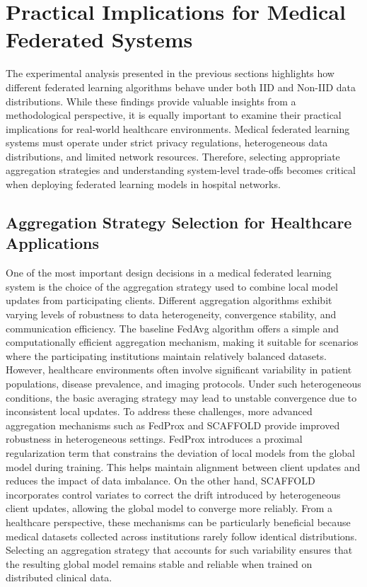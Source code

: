 \documentclass[12pt]{book}
\begin{document}
\chapter{Practical Implications for Medical Federated Systems}
The experimental analysis presented in the previous sections highlights how different federated learning algorithms behave under both IID and Non-IID data distributions. While these findings provide valuable insights from a methodological perspective, it is equally important to examine their practical implications for real-world healthcare environments. Medical federated learning systems must operate under strict privacy regulations, heterogeneous data distributions, and limited network resources. Therefore, selecting appropriate aggregation strategies and understanding system-level trade-offs becomes critical when deploying federated learning models in hospital networks.


\section{Aggregation Strategy Selection for Healthcare Applications}
One of the most important design decisions in a medical federated learning system is the choice of the aggregation strategy used to combine local model updates from participating clients. Different aggregation algorithms exhibit varying levels of robustness to data heterogeneity, convergence stability, and communication efficiency.
The baseline FedAvg algorithm offers a simple and computationally efficient aggregation mechanism, making it suitable for scenarios where the participating institutions maintain relatively balanced datasets. However, healthcare environments often involve significant variability in patient populations, disease prevalence, and imaging protocols. Under such heterogeneous conditions, the basic averaging strategy may lead to unstable convergence due to inconsistent local updates.
To address these challenges, more advanced aggregation mechanisms such as FedProx and SCAFFOLD provide improved robustness in heterogeneous settings. FedProx introduces a proximal regularization term that constrains the deviation of local models from the global model during training. This helps maintain alignment between client updates and reduces the impact of data imbalance. On the other hand, SCAFFOLD incorporates control variates to correct the drift introduced by heterogeneous client updates, allowing the global model to converge more reliably.
From a healthcare perspective, these mechanisms can be particularly beneficial because medical datasets collected across institutions rarely follow identical distributions. Selecting an aggregation strategy that accounts for such variability ensures that the resulting global model remains stable and reliable when trained on distributed clinical data.
\end{document}
